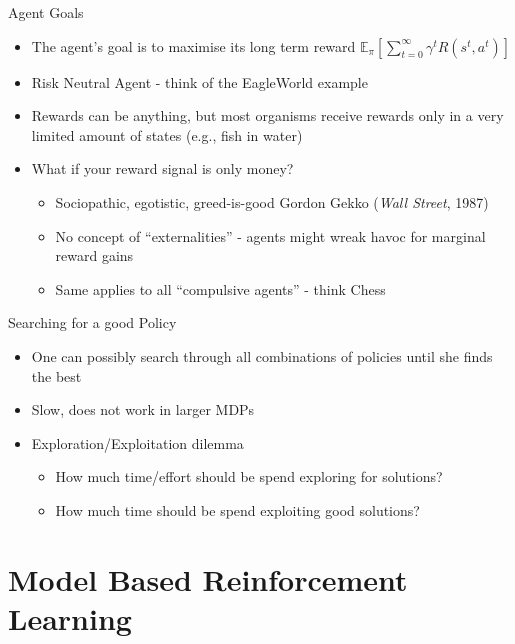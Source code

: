 \documentclass[]{beamer}
\providecommand{\tightlist}{%
  \setlength{\itemsep}{0pt}\setlength{\parskip}{0pt}}
\begin{document}
\begin{frame}{Agent Goals}

\begin{itemize}
\item
  The agent's goal is to maximise its long term reward
  \(\mathbb{E}_{\pi}\left[\sum\limits_{t=0}^\infty{\gamma^tR \left( s^{t},a^t \right)}\right]\)
\item
  Risk Neutral Agent - think of the EagleWorld example
\item
  Rewards can be anything, but most organisms receive rewards only in a
  very limited amount of states (e.g., fish in water)
\item
  What if your reward signal is only money?

  \begin{itemize}
  \tightlist
  \item
    Sociopathic, egotistic, greed-is-good Gordon Gekko (\emph{Wall
    Street}, 1987)
  \item
    No concept of ``externalities'' - agents might wreak havoc for
    marginal reward gains
  \item
    Same applies to all ``compulsive agents'' - think Chess
  \end{itemize}
\end{itemize}

\end{frame}

\begin{frame}{Searching for a good Policy}

\begin{itemize}
\tightlist
\item
  One can possibly search through all combinations of policies until she
  finds the best
\item
  Slow, does not work in larger MDPs
\item
  Exploration/Exploitation dilemma

  \begin{itemize}
  \tightlist
  \item
    How much time/effort should be spend exploring for solutions?
  \item
    How much time should be spend exploiting good solutions?
  \end{itemize}
\end{itemize}

\end{frame}

\section{Model Based Reinforcement
Learning}\label{model-based-reinforcement-learning}
\end{document}
